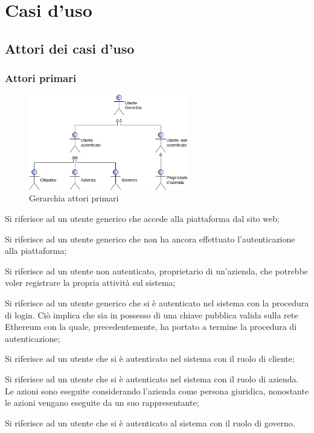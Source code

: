 \section{Casi d'uso} 
\subsection{Attori dei casi d'uso}
\subsubsection{Attori primari}
\begin{figure}[h]
	\includegraphics[width=7cm]{res/images/attori_primari.png}
	\centering
	\caption{Gerarchia attori primari}
\end{figure}
\begin{description}[style=nextline]
	\item[Utente Generico]
	Si riferisce ad un utente generico che accede alla piattaforma dal sito web;
	\item[Utente non autenticato]
	Si riferisce ad un utente generico che non ha ancora effettuato l'autenticazione alla piattaforma;
	\item[Proprietario d'azienda] Si riferisce ad un utente non autenticato, proprietario di un'azienda, che potrebbe voler registrare la propria attività sul sistema;
	\item[Utente autenticato]
	Si riferisce ad un utente generico che si è autenticato nel sistema con la procedura di login. Ciò implica che sia in possesso di una chiave pubblica valida sulla rete Ethereum con la quale, precedentemente, ha portato a termine la procedura di autenticazione;
	\item[Cittadino] Si riferisce ad un utente che si è autenticato nel sistema con il ruolo di cliente;
	\item[Azienda] Si riferisce ad un utente che si è autenticato nel sistema con il ruolo di azienda. Le azioni sono eseguite considerando l'azienda come persona giuridica, nonostante le azioni vengano eseguite da un suo rappresentante;
	\item[Governo\glosp] Si riferisce ad un utente che si è autenticato al sistema con il ruolo di governo\glosp.
\end{description}
